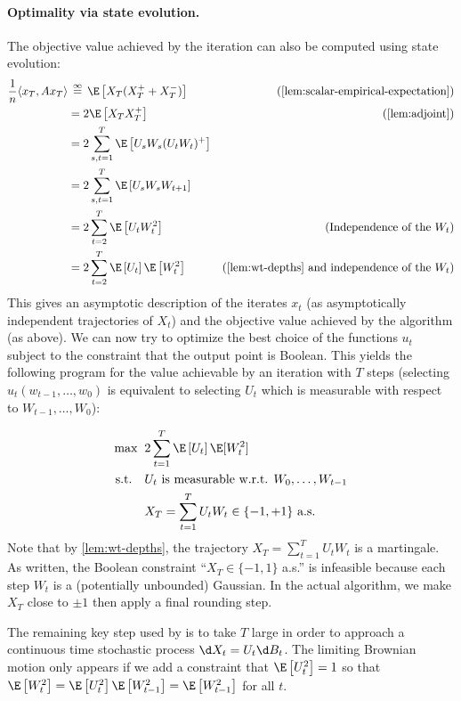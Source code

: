 \documentclass[12pt]{article}
\newcommand{\eqinf}{\,\overset{\infty}{=}\,}
\begin{document}
\paragraph{Optimality via state evolution.} The objective value achieved by the iteration can also be computed using state evolution:
\begin{align*}
    \frac 1n \langle  x_T, A x_T\rangle &\eqinf \E\left[X_T (X_T^+ + X_T^-)\right] & (\text{\cref{lem:scalar-empirical-expectation}})\\
    &= 2\E\left[X_T X_T^+\right] & (\text{\cref{lem:adjoint}})\\
    &= 2\sum_{s,t = 1}^T \E\left[U_s W_s (U_t W_t)^+\right]\\
    &= 2\sum_{s,t = 1}^T \E\left[U_s W_s W_{t+1}\right]\\
    &= 2\sum_{t = 2}^T \E\left[U_t W_t^2\right] & (\text{Independence of the $W_t$})\\
    &= 2\sum_{t = 2}^T \E\left[U_t\right] \E\left[W_t^2\right] & (\text{\cref{lem:wt-depths} and independence of the $W_t$})
\end{align*}
This gives an asymptotic description of the iterates $x_t$ (as asymptotically independent trajectories of $X_t$) and the objective value achieved by the algorithm (as above). We can now try to optimize
the best choice of the functions $u_t$ subject
to the constraint that the output point is Boolean.
This yields the following program for the value achievable by an iteration with $T$ steps (selecting $u_t(w_{t-1}, \dots, w_0)$ is equivalent to selecting $U_t$ which is measurable with respect to $W_{t-1}, \dots, W_0$):

\begin{align*}
    \max \;\;& 2\sum_{t=1}^T \E\left[U_t\right] \E[W_t^2]\\
    \textnormal{s.t. }\;\;
    &U_t \text{ is measurable w.r.t. $W_0, \dots, W_{t-1}$}\\
    &X_T = \sum_{t = 1}^T U_t W_t \in \{-1,+1\} \text{ a.s.}
\end{align*}
Note that by \cref{lem:wt-depths}, the trajectory $X_T = \sum_{t = 1}^T U_tW_t$ is a martingale.
As written, the Boolean constraint ``$X_T \in \{-1,1\}$ a.s.'' is infeasible because each step $W_t$ is a (potentially unbounded) Gaussian.
In the actual algorithm, we make $X_T$ close to $\pm 1$ then apply a final rounding step.

The remaining key step used by \cite{montanari2021optimization} is to take $T$ large
in order to approach a continuous time stochastic process $\d X_t = U_t \d B_t$.
The limiting Brownian motion only appears if we add a constraint that $\E\left[U_t^2\right] = 1$ so that $\E\left[W_t^2\right] = \E\left[U_t^2\right]\E\left[W_{t-1}^2\right] = \E\left[W_{t-1}^2\right]$ for all $t$.
\end{document}
